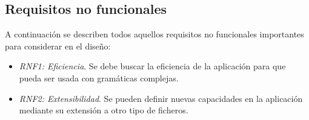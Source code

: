 

\subsection{Requisitos no funcionales}
A continuación se describen todos aquellos requisitos no funcionales importantes para considerar en el diseño:


\begin{itemize}
\item \textit{RNF1: Eficiencia}. Se debe buscar la eficiencia de la aplicación para que pueda ser usada con gramáticas complejas.
\item \textit{RNF2: Extensibilidad}. Se pueden definir nuevas capacidades en la aplicación mediante su extensión a otro tipo de ficheros.
\end{itemize}
